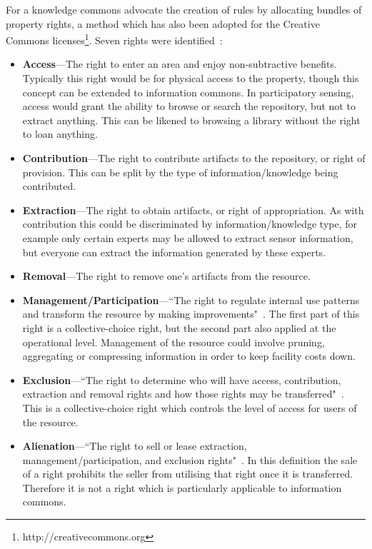 For a knowledge commons  advocate the creation of rules by allocating bundles of property rights, a method which has also been adopted for the Creative Commons licenses\footnote{http://creativecommons.org}. 
Seven rights were identified~\citep{Schlager1992}:
\begin{itemize}
\item \textbf{Access}---The right to enter an area and enjoy non-subtractive benefits. Typically this right would be for physical access to the property, though this concept can be extended to information commons. 
In participatory sensing, access would grant the ability to browse or search the repository, but not to extract anything. This can be likened to browsing a library without the right to loan anything. 
\item \textbf{Contribution}---The right to contribute artifacts to the repository, or right of provision. This can be split by the type of information/knowledge being contributed. 
\item \textbf{Extraction}---The right to obtain artifacts, or right of appropriation. 
As with contribution this could be discriminated by information/knowledge type, for example only certain experts may be allowed to extract sensor information, but everyone can extract the information generated by these experts.
\item \textbf{Removal}---The right to remove one's artifacts from the resource.
\item \textbf{Management/Participation}---``The right to regulate internal use patterns and transform the resource by making improvements"~\cite[p.52]{Ostrom2007a}. 
The first part of this right is a collective-choice right, but the second part also applied at the operational level. 
Management of the resource could involve pruning, aggregating or compressing information in order to keep facility costs down.
\item \textbf{Exclusion}---``The right to determine who will have access, contribution, extraction and removal rights and how those rights may be transferred"~\cite[p.53]{Ostrom2007a}. 
This is a collective-choice right which controls the level of access for users of the resource. 
\item \textbf{Alienation}---``The right to sell or lease extraction, management/participation, and exclusion rights"~\cite[p.53]{Ostrom2007a}. In this definition the sale of a right prohibits the seller from utilising that right once it is transferred. Therefore it is not a right which is particularly applicable to information commons.
\end{itemize}

